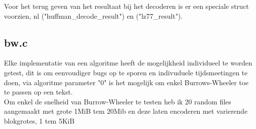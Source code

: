 \documentclass[10pt,a4paper]{report}
\begin{document}
Voor het terug geven van het resultaat bij het decoderen is er een speciale struct voorzien, nl ("huffman\_decode\_result") en ("lz77\_result"). 
\subsection*{bw.c}
Elke implementatie van een algoritme heeft de mogelijkheid individueel te worden getest, dit is om eenvoudiger bugs op te sporen en indivuduele tijdsmeetingen te doen, via algoritme parameter "0" is het mogelijk om enkel Burrows-Wheeler toe te passen op een tekst.\\

Om enkel de snelheid van Burrow-Wheeler te testen heb ik 20 random files aangemaakt met grote 1MiB tem 20Mib en deze laten encoderen met varierende blokgrotes, 1 tem 5KiB\\
\end{document}
